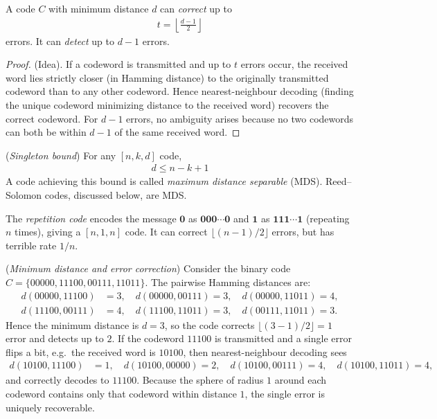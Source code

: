 \documentclass[a4paper, 12pt]{book} %
\begin{document}
\begin{definition}
    A code $C$ with minimum distance $d$ can \emph{correct} up to
    \begin{align}
        t = \left\lfloor \frac{d - 1}{2} \right\rfloor
    \end{align}
    errors. It can \emph{detect} up to $d - 1$ errors.
\end{definition}

\begin{proof}
    (Idea). If a codeword is transmitted and up to $t$ errors occur, the received word lies strictly closer (in Hamming distance) to the originally transmitted codeword than to any other codeword. Hence nearest-neighbour decoding (finding the unique codeword minimizing distance to the received word) recovers the correct codeword. For $d - 1$ errors, no ambiguity arises because no two codewords can both be within $d - 1$ of the same received word.
\end{proof}

\begin{theorem}
    (\emph{Singleton bound}) For any $[n, k, d]$ code,
    \begin{align}
        d \leq n - k + 1
    \end{align}
    A code achieving this bound is called \emph{maximum distance separable} (MDS). Reed--Solomon codes, discussed below, are MDS.
\end{theorem}

\begin{example}
    The \emph{repetition code} encodes the message $\mathbf{0}$ as $\mathbf{000\cdots 0}$ and $\mathbf{1}$ as $\mathbf{111\cdots 1}$ (repeating $n$ times), giving a $[n, 1, n]$ code. It can correct $\lfloor (n-1)/2 \rfloor$ errors, but has terrible rate $1/n$.
\end{example}

\begin{example}
    (\emph{Minimum distance and error correction}) Consider the binary code $C = \{00000, 11100, 00111, 11011\}$. The pairwise Hamming distances are:
    \begin{align}
        d(00000, 11100) &= 3, \quad d(00000, 00111) = 3, \quad d(00000, 11011) = 4, \\
        d(11100, 00111) &= 4, \quad d(11100, 11011) = 3, \quad d(00111, 11011) = 3.
    \end{align}
    Hence the minimum distance is $d = 3$, so the code corrects $\lfloor(3-1)/2\rfloor = 1$ error and detects up to $2$. If the codeword $11100$ is transmitted and a single error flips a bit, e.g.\ the received word is $10100$, then nearest-neighbour decoding sees
    \begin{align}
        d(10100, 11100) &= 1, \quad d(10100, 00000) = 2, \quad d(10100, 00111) = 4, \quad d(10100, 11011) = 4,
    \end{align}
    and correctly decodes to $11100$. Because the sphere of radius $1$ around each codeword contains only that codeword within distance $1$, the single error is uniquely recoverable.
\end{example}
\end{document}
